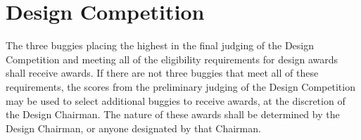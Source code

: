 \section{Design Competition}

	The three buggies placing the highest in the final judging of the Design Competition and meeting all of the eligibility requirements for design awards shall receive awards. If there are not three buggies that meet all of these requirements, the scores from the preliminary judging of the Design Competition may be used to select additional buggies to receive awards, at the discretion of the Design Chairman. The nature of these awards shall be determined by the Design Chairman, or anyone designated by that Chairman.

